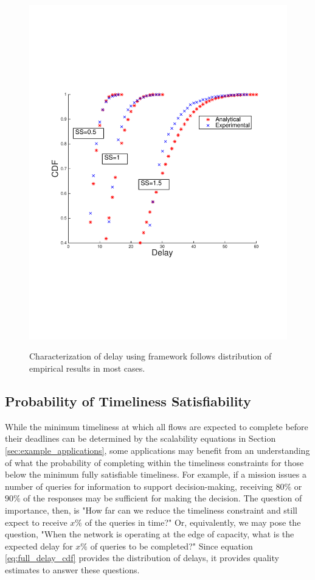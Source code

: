 \begin{figure}[]
{        \includegraphics[scale=0.40, clip=true, trim=12mm 65mm 20mm 65mm]{figures/delay_cdfs/delay_cdf_grid_half.pdf}
        \label{fig:delay_cdf_grid}
        }
   \caption{Characterization of delay using framework follows distribution of empirical results in most cases.}
   \label{fig:delay_cdf_anal_vs_sim}
   \vspace{-4mm}
\end{figure}

\subsection{Probability of Timeliness Satisfiability}

While the minimum timeliness at which all flows are expected to complete before their deadlines can be determined by the scalability equations in Section \ref{sec:example_applications}, some applications may benefit from an understanding of what the probability of completing within the timeliness constraints for those below the minimum fully satisfiable timeliness.  For example, if a mission issues a number of queries for information to support decision-making, receiving $80\%$ or $90\%$ of the responses may be sufficient for making the decision.  The question of importance, then, is "How far can we reduce the timeliness constraint and still expect to receive $x\%$ of the queries in time?"  Or, equivalently, we may pose the question, "When the network is operating at the edge of capacity, what is the expected delay for $x\%$ of queries to be completed?"  Since equation \ref{eq:full_delay_cdf} provides the distribution of delays, it provides quality estimates to answer these questions.  

